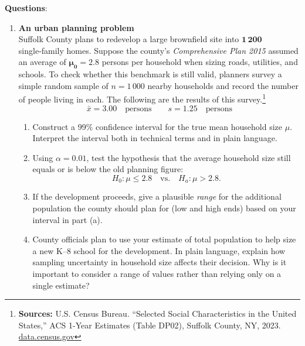 \documentclass{article}
\begin{document}
\textbf{Questions}:
\begin{enumerate} %

\item \textbf{An urban planning problem} \\
Suffolk County plans to redevelop a large brownfield site into \(\mathbf{1\,200}\) single‑family homes.
Suppose the county’s \emph{Comprehensive Plan 2015} assumed an average of \(\boldsymbol{\mu_0 = 2.8}\) persons per household when sizing roads, utilities, and schools.
To check whether this benchmark is still valid, planners survey a simple random sample of \(n = 1\,000\) nearby households and record the number of people living in each. The following are the results of this survey.\footnote{\textbf{Sources:} U.S. Census Bureau. “Selected Social Characteristics in the United States,” ACS 1-Year Estimates (Table DP02), Suffolk County, NY, 2023. \href{https://data.census.gov/table/ACSDP1Y2023.DP02?q=DP02&g=050XX00US36103&d=ACS+1-Year+Estimates+Data+Profiles}{data.census.gov}}
\[
\bar{x}=3.00 \quad\text{persons}\qquad
s = 1.25 \quad\text{persons}
\]
\begin{enumerate}[label=(\alph*)]
  \item Construct a 99\% confidence interval for the true mean household size \(\mu\). Interpret the interval both in technical terms and in plain language.
  \item Using \(\alpha = 0.01\), test the hypothesis that the average household size still equals or is below the old planning figure:
        \[
           H_0\!: \mu \le 2.8
           \quad\text{vs.}\quad
           H_a\!: \mu > 2.8.
        \]
  \item If the development proceeds, give a plausible \emph{range} for the additional population the county should plan for (low and high ends) based on your interval in part (a).
  \item County officials plan to use your estimate of total population to help size a new K–8 school for the development. In plain language, explain how sampling uncertainty in household size affects their decision. Why is it important to consider a range of values rather than relying only on a single estimate?
\end{enumerate}


\end{enumerate}
\end{document}
